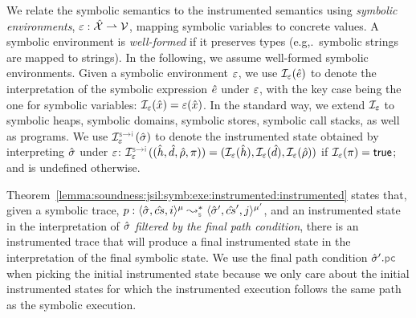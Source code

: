 We relate the symbolic semantics to the instrumented semantics using 
\emph{symbolic environments}, $\varepsilon : \hat{\mathcal{X}} \rightharpoonup \mathcal{V}$, mapping 
symbolic variables to concrete values. 
A symbolic environment is \emph{well-formed} if it preserves types (e.g,.~symbolic strings are mapped to strings). In the following, we  
assume well-formed symbolic environments. 
%
Given a symbolic environment $\varepsilon$, we use $\mathcal{I}_\varepsilon(\hat{e})$ to denote the
interpretation of the symbolic expression $\hat{e}$ under $\varepsilon$, with the key case
being the one for symbolic variables: $\mathcal{I}_\varepsilon(\hat{x}) = \varepsilon(\hat{x})$. In the
standard way, we extend
$\mathcal{I}_\varepsilon$ to symbolic heaps, symbolic domains, symbolic stores, symbolic call stacks,
as well as programs. We use $\interpret{\symbinst}{\senv}(\sstate)$ to 
denote the instrumented state obtained by interpreting $\hat{\sigma}$ under $\varepsilon$:
$\interpret{\symbinst}{\senv}((\sheap, \sdom, \sstore, \pc)) = (\shorthand(\sheap), \shorthand(\sdom), \shorthand(\sstore))$ if $\mathcal{I}_\varepsilon(\pi) = {\sf true}$; and is undefined otherwise.

Theorem~\ref{lemma:soundness:jsil:symb:exe:instrumented:instrumented} states 
that, given a symbolic trace, $\prog : \transabssemrule{\sstate, \scs, i}{\sstate', \scs', j}{\mode}{\mode'}{\symbolic}$,
 and an instrumented state in the interpretation of $\hat{\sigma}$ \emph{filtered by the final 
 path condition}, there is an instrumented trace that will produce a final instrumented state 
 in the interpretation of the final symbolic state. 
 We use the final path condition $\sstate'.\pcsel$ when picking the initial 
 instrumented state because we only care about the initial instrumented states for which 
the instrumented execution follows the same path as the symbolic execution. 



